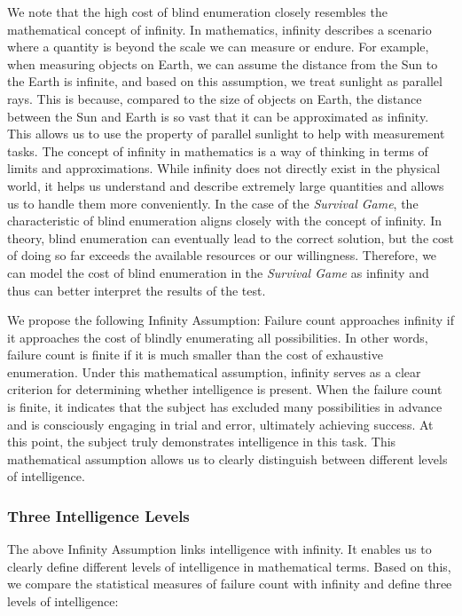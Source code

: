 We note that the high cost of blind enumeration closely resembles the mathematical concept of infinity. In mathematics, infinity describes a scenario where a quantity is beyond the scale we can measure or endure. For example, when measuring objects on Earth, we can assume the distance from the Sun to the Earth is infinite, and based on this assumption, we treat sunlight as parallel rays. This is because, compared to the size of objects on Earth, the distance between the Sun and Earth is so vast that it can be approximated as infinity. This allows us to use the property of parallel sunlight to help with measurement tasks. The concept of infinity in mathematics is a way of thinking in terms of limits and approximations. While infinity does not directly exist in the physical world, it helps us understand and describe extremely large quantities and allows us to handle them more conveniently.
In the case of the \textit{Survival Game}, the characteristic of blind enumeration aligns closely with the concept of infinity. In theory, blind enumeration can eventually lead to the correct solution, but the cost of doing so far exceeds the available resources or our willingness. Therefore, we can model the cost of blind enumeration in the \textit{Survival Game} as infinity and thus can better interpret the results of the test.


We propose the following Infinity Assumption: Failure count approaches infinity if it approaches the cost of blindly enumerating all possibilities. In other words, failure count is finite if it is much smaller than the cost of exhaustive enumeration.
Under this mathematical assumption, infinity serves as a clear criterion for determining whether intelligence is present. When the failure count is finite, it indicates that the subject has excluded many possibilities in advance and is consciously engaging in trial and error, ultimately achieving success. At this point, the subject truly demonstrates intelligence in this task. This mathematical assumption allows us to clearly distinguish between different levels of intelligence.


\subsubsection{Three Intelligence Levels}

The above Infinity Assumption links intelligence with infinity. It enables us to clearly define different levels of intelligence in mathematical terms. Based on this, we compare the statistical measures of failure count with infinity and define three levels of intelligence:

